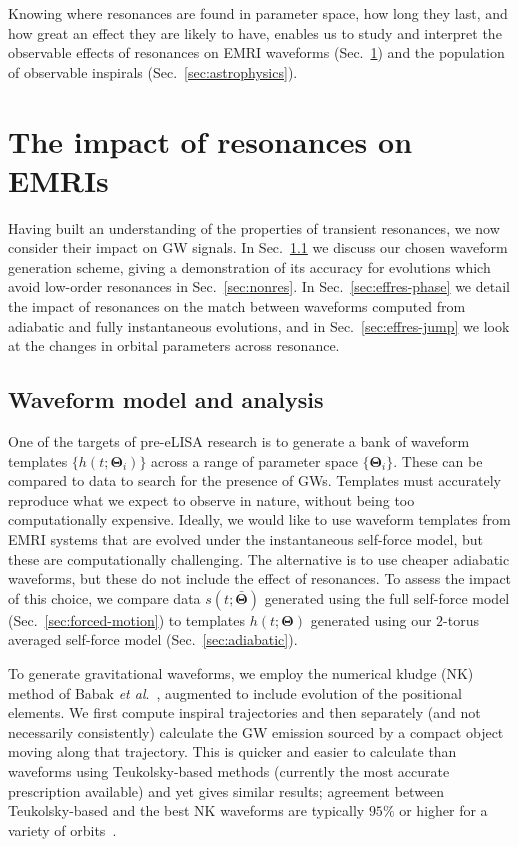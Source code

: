 \documentclass[aps,prd,amsfonts,amssymb,amsmath,nofootinbib,showpacs,superscriptaddress,twocolumn,floatfix]{revtex4-1}
\newcommand{\secref}[1]{Sec.~\ref{sec:#1}}
\begin{document}
Knowing where resonances are found in parameter space, how long they last, and how great an effect they are likely to have, enables us to study and interpret the observable effects of resonances on EMRI waveforms (\secref{waveforms}) and the population of observable inspirals (\secref{astrophysics}).


\section{The impact of resonances on EMRIs}
\label{sec:waveforms}

Having built an understanding of the properties of transient resonances, we now consider their impact on GW signals. In \secref{kludge} we discuss our chosen waveform generation scheme, giving a demonstration of its accuracy for evolutions which avoid low-order resonances in \secref{nonres}. In \secref{effres-phase} we detail the impact of resonances on the match between waveforms computed from adiabatic and fully instantaneous evolutions, and in \secref{effres-jump} we look at the changes in orbital parameters across resonance.

\subsection{Waveform model and analysis}
\label{sec:kludge}

One of the targets of pre-eLISA research is to generate a bank of waveform templates $\{h(t;\boldsymbol{\Theta}_i)\}$ across a range of parameter space $\{\boldsymbol{\Theta}_i\}$. These can be compared to data to search for the presence of GWs. Templates must accurately reproduce what we expect to observe in nature, without being too computationally expensive. Ideally, we would like to use waveform templates from EMRI systems that are evolved under the instantaneous self-force model, but these are computationally challenging. The alternative is to use cheaper adiabatic waveforms, but these do not include the effect of resonances. To assess the impact of this choice, we compare data $s(t;\bar{\boldsymbol{\Theta}})$ generated using the full self-force model (\secref{forced-motion}) to templates $h(t;\boldsymbol{\Theta})$ generated using our $2$-torus averaged self-force model (\secref{adiabatic}).

To generate gravitational waveforms, we employ the numerical kludge (NK) method of Babak {\it{et al}}.~\cite{Babak2007}, augmented to include evolution of the positional elements. We first compute inspiral trajectories and then separately (and not necessarily consistently) calculate the GW emission sourced by a compact object moving along that trajectory. This is quicker and easier to calculate than waveforms using Teukolsky-based methods (currently the most accurate prescription available) and yet gives similar results; agreement between Teukolsky-based and the best NK waveforms are typically $95\%$ or higher for a variety of orbits~\cite{Babak2007, Berry2013}.
\end{document}
